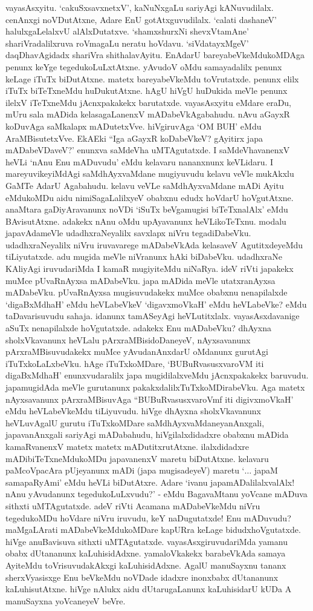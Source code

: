 vayasAsxyitu. `cakuSxsavxnetxV', kaNuNxgaLu sariyAgi kANuvudilalx. cenAnxgi noVDutAtxne, Adare EnU gotAtxguvudilalx. `calati dashaneV' halulxgaLelalxvU alAlxDutatxve. `shamxshurxNi shevxVtamAne' shariVradalilxruva roVmagaLu neratu hoVdavu. `siVdatayxMgeV' daqDhavAgidadx shariVra shithalavAyitu. EnAdarU bareyabeVkeMdukoMDAga penunx keYge tegedukoLuLxtAtxne. yAvudoV oMdu samayadalilx penunx keLage iTuTx biDutAtxne. matetx bareyabeVkeMdu toVrutatxde. penunx elilx iTuTx biTeTxneMdu huDukutAtxne. hAgU hiVgU huDukida meVle penunx ilelxV iTeTxneMdu jAcnxpakakekx barutatxde. vayasAsxyitu eMdare eraDu, mUru sala mADida kelasagaLanenxV mADabeVkAgabahudu. nAvu aGayxR koDuvAga saMkalapx mADutetxVve. hiVgiruvAga `OM BUH' eMdu AraMBisutetxVve. EkAEki ``Iga aGayxR koDabeVkeV? gAyitirx japa mADabeVDaveV?' enunxva saMdeVha uMTAgutatxde. I saMdeVhavanenxV heVLi `nAnu Enu mADuvudu' eMdu kelavaru nananxnunx keVLidaru. I mareyuvikeyiMdAgi saMdhAyxvaMdane mugiyuvudu kelavu veVle mukAkxlu GaMTe AdarU Agabahudu. kelavu veVLe saMdhAyxvaMdane mADi Ayitu eMdukoMDu aidu nimiSagaLalilxyeV obabxnu edudx hoVdarU hoVgutAtxne. anaMtara gaDiyAravanunx noVDi `iSuTx beVgamugisi biTeTxnalAlx' eMdu BAvisutAtxne. adakekx nAnu oMdu upAyavanunx heVLikoTeTxnu. modalu japavAdameVle udadhxraNeyalilx savxlapx niVru tegadiDabeVku. udadhxraNeyalilx niVru iruvavarege mADabeVkAda kelasaveV AgutitxdeyeMdu tiLiyutatxde. adu mugida meVle niVranunx hAki biDabeVku. udadhxraNe KAliyAgi iruvudariMda I kamaR mugiyiteMdu niNaRya. ideV riVti japakekx muMce pUvaRnAyxsa mADabeVku. japa mADida meVle utatxranAyxsa mADabeVku. pUvaRnAyxsa mugisuvudakekx muMce obabxnu nenapilalxde `digaBxMdhaH' eMdu heVLabeVkeV `digavxmoVkaH' eMdu heVLabeVke? eMdu taDavarisuvudu sahaja. idanunx tamASeyAgi heVLutitxlalx. vayasAsxdavanige aSuTx nenapilalxde hoVgutatxde. adakekx Enu mADabeVku? dhAyxna sholxVkavanunx heVLalu pArxraMBisidoDaneyeV, nAyxsavanunx pArxraMBisuvudakekx muMce yAvudanAnxdarU oMdanunx gurutAgi iTuTxkoLaLxbeVku. hAge iTuTxkoMDare, `BUBuRvasusxvaroVM iti digaBxMdhaH' enunxvudaralilx japa mugidilalxveMdu jAcnxpakakekx baruvudu. japamugidAda meVle gurutanunx pakakxdalilxTuTxkoMDirabeVku. Aga matetx nAyxsavanunx pArxraMBisuvAga ``BUBuRvasusxvaroVmf iti digivxmoVkaH' eMdu heVLabeVkeMdu tiLiyuvudu. hiVge dhAyxna sholxVkavanunx heVLuvAgalU gurutu iTuTxkoMDare saMdhAyxvaMdaneyanAnxgali, japavanAnxgali sariyAgi mADabahudu, hiVgilalxdidadxre obabxnu mADida kamaRvanenxV matetx matetx mADutitxrutAtxne. ilalxdidadxre mADibiTeTxneMdukoMDu japavanenxV maretu biDutAtxne. kelavaru paMcoVpacAra pUjeyanunx mADi (japa mugisadeyeV) maretu `$\ldots$ japaM samapaRyAmi' eMdu heVLi biDutAtxre. Adare `ivanu japamADalilalxvalAlx! nAnu yAvudanunx tegedukoLuLxvudu?' - eMdu BagavaMtanu yoVcane mADuva sithxti uMTAgutatxde. adeV riVti Acamana mADabeVkeMdu niVru tegedukoMDu hoVdare niVru iruvudu, keY naDugutatxde! Enu mADuvudu? maMgaLArati mADabeVkeMdukoMDare kapURra keLage bidudxhoVgutatxde. hiVge anuBavisuva sithxti uMTAgutatxde. vayasAsxgiruvudariMda yamanu obabx dUtananunx kaLuhisidAdxne. yamaloVkakekx barabeVkAda samaya AyiteMdu toVrisuvudakAkxgi kaLuhisidAdxne. AgalU manuSayxnu tananx sherxVyasisxge Enu beVkeMdu noVDade idadxre inonxbabx dUtananunx kaLuhisutAtxne. hiVge nAlukx aidu dUtarugaLanunx kaLuhisidarU kUDa A manuSayxna yoVcaneyeV beVre. 